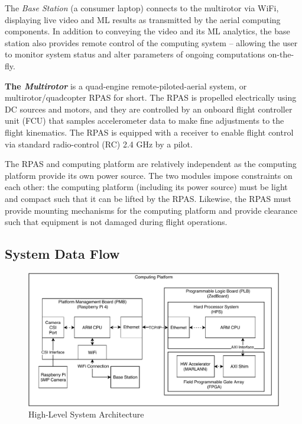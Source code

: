 The \textit{Base Station} (a consumer laptop) connects to the multirotor via WiFi, displaying live video and ML results as transmitted by the aerial computing components. In addition to conveying the video and its ML analytics, the base station also provides remote control of the computing system -- allowing the user to monitor system status and alter parameters of ongoing computations on-the-fly.

\textbf{The \textit{Multirotor}} is a quad-engine remote-piloted-aerial system, or multirotor/quadcopter RPAS for short.
The RPAS is propelled electrically using DC sources and motors, and they are controlled by an onboard flight controller unit (FCU) that samples accelerometer data to make fine adjustments to the flight kinematics.
The RPAS is equipped with a receiver to enable flight control via standard radio-control (RC) 2.4 GHz by a pilot.

The RPAS and computing platform are relatively independent as the computing platform provide its own power source. The two modules impose constraints on each other: the computing platform (including its power source) must be light and compact such that it can be lifted by the RPAS. 
Likewise, the RPAS must provide mounting mechanisms for the computing platform and provide clearance such that equipment is not damaged during flight operations.

\subsection{System Data Flow}

\begin{figure}[H]
\centering
\includegraphics[width=15cm]{img/pc_diagram.pdf}
\caption{High-Level System Architecture}
\label{pcdiag}
\end{figure}

